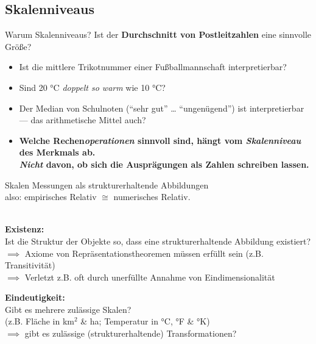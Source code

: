 \documentclass[
  10pt,
  ignorenonframetext,
]{beamer}
\providecommand{\tightlist}{%
  \setlength{\itemsep}{0pt}\setlength{\parskip}{0pt}}
\begin{document}
\hypertarget{skalenniveaus}{%
\subsection{Skalenniveaus}\label{skalenniveaus}}

\begin{frame}{Warum Skalenniveaus?}
\protect\hypertarget{warum-skalenniveaus}{}
Ist der \textbf{Durchschnitt von Postleitzahlen} eine sinnvolle Größe?

\begin{itemize}[<+->]
\tightlist
\item
  Ist die mittlere Trikotnummer einer Fußballmannschaft interpretierbar?
\item
  Sind 20 °C \emph{doppelt so warm} wie 10 °C?
\item
  Der Median von Schulnoten (``sehr gut'' \ldots{} ``ungenügend'') ist
  interpretierbar --- das arithmetische Mittel auch?
\end{itemize}

\vspace{1em}

\begin{itemize}[<+->]
\tightlist
\item
  \textbf{Welche Rechen\emph{operationen} sinnvoll sind, hängt vom
  \emph{Skalenniveau} des Merkmals ab.\\
  \emph{Nicht} davon, ob sich die Ausprägungen als Zahlen schreiben
  lassen.}
\end{itemize}
\end{frame}

\begin{frame}{Skalen}
\protect\hypertarget{skalen}{}
Messungen als strukturerhaltende Abbildungen\\
also: empirisches Relativ \(\cong\) numerisches Relativ.\\
\strut \\

\textbf{Existenz:}\\
Ist die Struktur der Objekte so, dass eine strukturerhaltende Abbildung
existiert?\\
\(\implies\) Axiome von Repräsentationstheoremen müssen erfüllt sein
(z.B. Transitivität)\\
\(\implies\) Verletzt z.B. oft durch unerfüllte Annahme von
Eindimensionalität

\hfill\break

\textbf{Eindeutigkeit:}\\
Gibt es mehrere zulässige Skalen?\\
(z.B. Fläche in km\(^2\) \& ha; Temperatur in °C, °F \& °K)\\
\(\implies\) gibt es zulässige (strukturerhaltende) Transformationen?
\end{frame}
\end{document}
